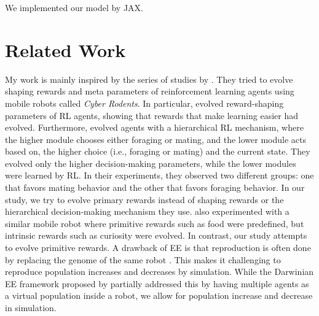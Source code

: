 We implemented our model by JAX.

\section{Related Work}
My work is mainly inspired by the series of studies by \citet{elfwingBiologicallyInspiredEmbodied2005,elfwingDarwinianEmbodiedEvolution2011a,elfwingEmergencePolymorphicMating2014}. They tried to evolve shaping rewards and meta parameters of reinforcement learning agents using mobile robots called \textit{Cyber Rodents}. In particular, \citet{elfwingDarwinianEmbodiedEvolution2011a} evolved reward-shaping parameters of RL agents, showing that rewards that make learning easier had evolved. Furthermore, \citet{elfwingEmergencePolymorphicMating2014} evolved agents with a hierarchical RL mechanism, where the higher module chooses either foraging or mating, and the lower module acts based on, the higher choice (i.e., foraging or mating) and the current state. They evolved only the higher decision-making parameters, while the lower modules were learned by RL\@. In their experiments, they observed two different groups: one that favors mating behavior and the other that favors foraging behavior. In our study, we try to evolve primary rewards instead of shaping rewards or the hierarchical decision-making mechanism they use. \citet{uchibeFindingIntrinsicRewards2008} also experimented with a similar mobile robot where primitive rewards such as food were predefined, but intrinsic rewards such as curiosity were evolved. In contrast, our study attempts to evolve primitive rewards. A drawback of EE is that reproduction is often done by replacing the genome of the same robot \citep{bredecheEmbodiedEvolutionCollective2018}. This makes it challenging to reproduce population increases and decreases by simulation. While the Darwinian EE framework proposed by \citet{elfwingDarwinianEmbodiedEvolution2011a} partially addressed this by having multiple agents as a virtual population inside a robot, we allow for population increase and decrease in simulation.